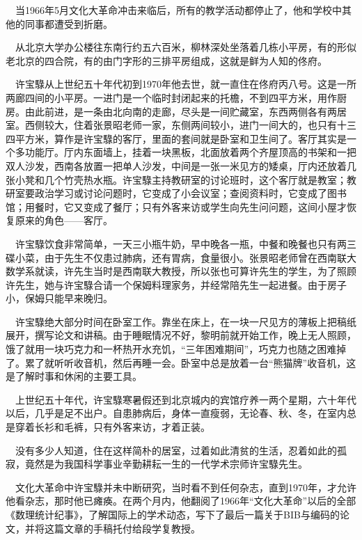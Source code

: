 \begin{frame}
	$\quad$当1966年5月文化大革命冲击来临后，所有的教学活动都停止了，他和学校中其他的同事都遭受到折磨。
	
	$\quad$从北京大学办公楼往东南行约五六百米，柳林深处坐落着几栋小平房，有的形似老北京的四合院，有的由门字形的三排平房组成，这就是鲜为人知的佟府。
	
	$\quad$许宝騄从上世纪五十年代初到1970年他去世，就一直住在佟府丙八号。这是一所两廊四间的小平房。一进门是一个临时封闭起来的托檐，不到四平方米，用作厨房。由此前进，是一条由北向南的走廊，尽头是一间贮藏室，东西两侧各有两居室。西侧较大，住着张景昭老师一家，东侧两间较小，进门一间大的，也只有十三四平方米，算作是许宝騄的客厅，里面的套间就是卧室和卫生间了。客厅其实是一个多功能厅。厅内东面墙上，挂着一块黑板，北面放着两个齐屋顶高的书架和一把双人沙发，西南各放置一把单人沙发，中间是一张一米见方的矮桌，厅内还放着几张小凳和几个竹壳热水瓶。许宝騄主持教研室的讨论班时，这个客厅就是教室；教研室要政治学习或讨论问题时，它变成了小会议室；查阅资料时，它变成了图书馆；用餐时，它又变成了餐厅；只有外客来访或学生向先生问问题，这间小屋才恢复原来的角色——客厅。
	
\end{frame}

\begin{frame}
	$\quad$许宝騄饮食非常简单，一天三小瓶牛奶，早中晚各一瓶，中餐和晚餐也只有两三碟小菜，由于先生不仅患过肺病，还有胃病，食量很小。张景昭老师曾在西南联大数学系就读，许先生当时是西南联大教授，所以张也可算许先生的学生，为了照顾许先生，她与许宝騄合请一个保姆料理家务，并经常陪先生一起进餐。由于房子小，保姆只能早来晚归。

	$\quad$许宝騄绝大部分时间在卧室工作。靠坐在床上，在一块一尺见方的薄板上把稿纸展开，撰写论文和讲稿。由于睡眠情况不好，黎明前就开始工作，晚上无人照顾，饿了就用一块巧克力和一杯热开水充饥，“三年困难期间”，巧克力也随之困难掉了。累了就听听收音机，然后再睡一会。卧室中总是放着一台“熊猫牌”收音机，这是了解时事和休闲的主要工具。
	
\end{frame}

\begin{frame}
	$\quad$上世纪五十年代，许宝騄寒暑假还到北京城内的宾馆疗养一两个星期，六十年代以后，几乎是足不出户。自患肺病后，身体一直瘦弱，无论春、秋、冬，在室内总是穿着长衫和毛裤，只有外客来访，才着正装。
	
	$\quad$没有多少人知道，住在这样简朴的居室，过着如此清贫的生活，忍着如此的孤寂，竟然是为我国科学事业辛勤耕耘一生的一代学术宗师许宝騄先生。
	
	$\quad$文化大革命中许宝騄并未中断研究，当时看不到任何杂志，直到1970年，才允许他看杂志，那时他已瘫痪。在两个月内，他翻阅了1966年“文化大革命”以后的全部《数理统计纪事》，了解国际上的学术动态，写下了最后一篇关于BIB与编码的论文，并将这篇文章的手稿托付给段学复教授。
	
\end{frame}

